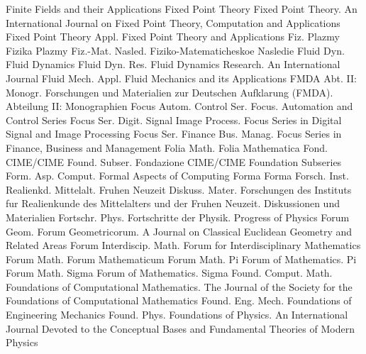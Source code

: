 {Finite Fields and their Applications}
{Fixed Point Theory}
{Fixed Point Theory. An International Journal on Fixed Point Theory, Computation and Applications}
{Fixed Point Theory Appl.}
{Fixed Point Theory and Applications}
{Fiz. Plazmy}
{Fizika Plazmy}
{Fiz.-Mat. Nasled.}
{Fiziko-Matematicheskoe Nasledie}
{Fluid Dyn.}
{Fluid Dynamics}
{Fluid Dyn. Res.}
{Fluid Dynamics Research. An International Journal}
{Fluid Mech. Appl.}
{Fluid Mechanics and its Applications}
{FMDA Abt. II: Monogr.}
{Forschungen und Materialien zur Deutschen Aufklarung (FMDA). Abteilung II: Monographien}
{Focus Autom. Control Ser.}
{Focus. Automation and Control Series}
{Focus Ser. Digit. Signal Image Process.}
{Focus Series in Digital Signal and Image Processing}
{Focus Ser. Finance Bus. Manag.}
{Focus Series in Finance, Business and Management}
{Folia Math.}
{Folia Mathematica}
{Fond. CIME/CIME Found. Subser.}
{Fondazione CIME/CIME Foundation Subseries}
{Form. Asp. Comput.}
{Formal Aspects of Computing}
{Forma}
{Forma}
{Forsch. Inst. Realienkd. Mittelalt. Fruhen Neuzeit Diskuss. Mater.}
{Forschungen des Instituts fur Realienkunde des Mittelalters und der Fruhen Neuzeit. Diskussionen und Materialien}
{Fortschr. Phys.}
{Fortschritte der Physik. Progress of Physics}
{Forum Geom.}
{Forum Geometricorum. A Journal on Classical Euclidean Geometry and Related Areas}
{Forum Interdiscip. Math.}
{Forum for Interdisciplinary Mathematics}
{Forum Math.}
{Forum Mathematicum}
{Forum Math. Pi}
{Forum of Mathematics. Pi}
{Forum Math. Sigma}
{Forum of Mathematics. Sigma}
{Found. Comput. Math.}
{Foundations of Computational Mathematics. The Journal of the Society for the Foundations of Computational Mathematics}
{Found. Eng. Mech.}
{Foundations of Engineering Mechanics}
{Found. Phys.}
{Foundations of Physics. An International Journal Devoted to the Conceptual Bases and Fundamental Theories of Modern Physics}
